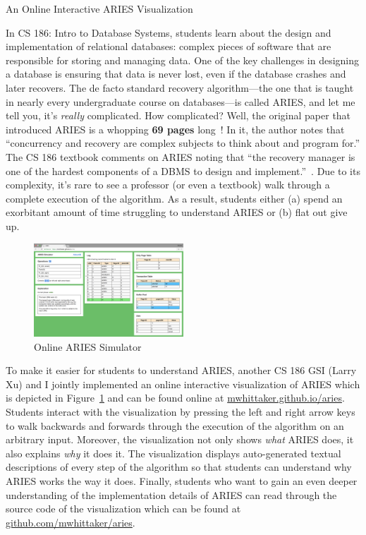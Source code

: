 \documentclass[12pt]{article}
\begin{document}
\begin{center}
  {\Large An Online Interactive ARIES Visualization}
\end{center}

In CS 186: Intro to Database Systems, students learn about the design and
implementation of relational databases: complex pieces of software that are
responsible for storing and managing data. One of the key challenges in
designing a database is ensuring that data is never lost, even if the database
crashes and later recovers. The de facto standard recovery algorithm---the one
that is taught in nearly every undergraduate course on databases---is called
ARIES, and let me tell you, it's \emph{really} complicated. How complicated?
Well, the original paper that introduced ARIES is a whopping \textbf{69 pages}
long~\cite{mohan1992aries}! In it, the author notes that ``concurrency and
recovery are complex subjects to think about and program for.'' The CS 186
textbook comments on ARIES noting that ``the recovery manager is one of the
hardest components of a DBMS to design and
implement.''~\cite{ramakrishnan2000database}. Due to its complexity, it's rare
to see a professor (or even a textbook) walk through a complete execution of
the algorithm. As a result, students either (a) spend an exorbitant amount of
time struggling to understand ARIES or (b) flat out give up.

\begin{figure}
  \centering
  \includegraphics[width=0.5\textwidth]{aries.png}
  \caption{Online ARIES Simulator}\label{LarrysAries}
\end{figure}

To make it easier for students to understand ARIES, another CS 186 GSI (Larry
Xu) and I jointly implemented an online interactive visualization of ARIES
which is depicted in Figure~\ref{LarrysAries} and can be found online at
\url{mwhittaker.github.io/aries}. Students interact with the visualization by
pressing the left and right arrow keys to walk backwards and forwards through
the execution of the algorithm on an arbitrary input. Moreover, the
visualization not only shows \emph{what} ARIES does, it also explains
\emph{why} it does it. The visualization displays auto-generated textual
descriptions of every step of the algorithm so that students can understand why
ARIES works the way it does. Finally, students who want to gain an even deeper
understanding of the implementation details of ARIES can read through the
source code of the visualization which can be found at
\url{github.com/mwhittaker/aries}.
\end{document}
